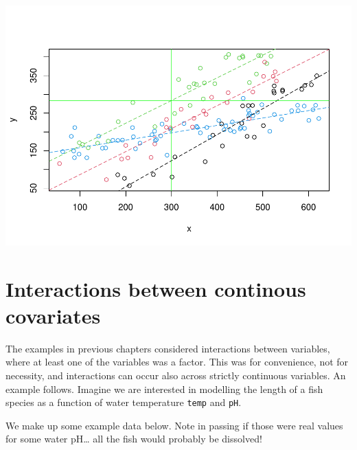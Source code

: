 \documentclass[
]{book}
\begin{document}
\includegraphics{ECOMODbook_files/figure-latex/a11.27-1.pdf}

\chapter{Interactions between continous covariates}\label{ContinousInteractions}

The examples in previous chapters considered interactions between variables, where at least one of the variables was a factor. This was for convenience, not for necessity, and interactions can occur also across strictly continuous variables. An example follows. Imagine we are interested in modelling the length of a fish species as a function of water temperature \texttt{temp} and \texttt{pH}.

We make up some example data below. Note in passing if those were real values for some water pH\ldots{} all the fish would probably be dissolved!
\end{document}
